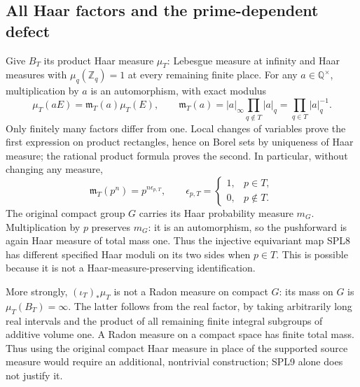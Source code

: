 \subsection{All Haar factors and the prime-dependent defect}

Give $B_T$ its product Haar measure $\mu_T$: Lebesgue measure at
infinity and Haar measures with $\mu_q(\mathbb Z_q)=1$ at every
remaining finite place. For any $a\in\mathbb Q^\times$, multiplication
by $a$ is an automorphism, with exact modulus
\begin{equation}\tag{SPL14}
\mu_T(aE)=\mathfrak m_T(a)\mu_T(E),\qquad
\mathfrak m_T(a)=|a|_\infty\prod_{q\notin T}|a|_q
=\prod_{q\in T}|a|_q^{-1}.
\end{equation}
Only finitely many factors differ from one. Local changes of variables
prove the first expression on product rectangles, hence on Borel sets
by uniqueness of Haar measure; the rational product formula proves
the second. In particular, without changing any measure,
\begin{equation}\tag{SPL15}
\mathfrak m_T(p^n)=p^{n\epsilon_{p,T}},\qquad
\epsilon_{p,T}=\begin{cases}1,&p\in T,\\0,&p\notin T.\end{cases}
\end{equation}
The original compact group $G$ carries its Haar probability measure
$m_G$. Multiplication by $p$ preserves $m_G$: it is an automorphism,
so the pushforward is again Haar measure of total mass one. Thus
the injective equivariant map SPL8 has different specified Haar
moduli on its two sides when $p\in T$. This is possible because
it is not a Haar-measure-preserving identification.

More strongly, $(\iota_T)_*\mu_T$ is not a Radon measure on compact
$G$: its mass on $G$ is $\mu_T(B_T)=\infty$. The latter follows
from the real factor, by taking arbitrarily long real intervals and
the product of all remaining finite integral subgroups of additive
volume one. A Radon measure on a compact space has finite total
mass. Thus using the original compact Haar measure in place of the
supported source measure would require an additional, nontrivial
construction; SPL9 alone does not justify it.

